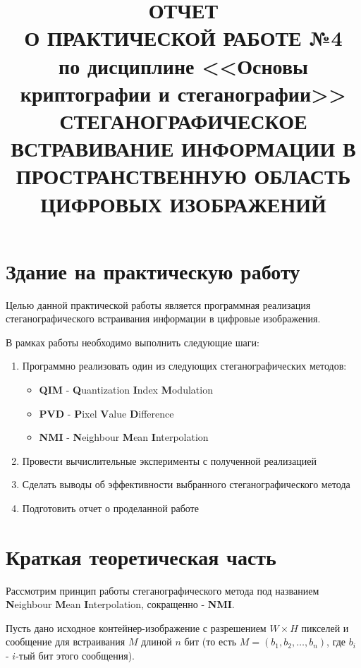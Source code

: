 \documentclass[a4paper]{article}
\title{
  ОТЧЕТ \\
  О ПРАКТИЧЕСКОЙ РАБОТЕ №4 \\
  по дисциплине <<Основы криптографии и стеганографии>> \\
  СТЕГАНОГРАФИЧЕСКОЕ ВСТРАВИВАНИЕ ИНФОРМАЦИИ В ПРОСТРАНСТВЕННУЮ ОБЛАСТЬ ЦИФРОВЫХ ИЗОБРАЖЕНИЙ
}
\begin{document}
  \templatedtitlepage
  
  \toc

  \section{Здание на практическую работу}

  Целью данной практической работы является программная реализация стеганографического встраивания информации в цифровые изображения.

  В рамках работы необходимо выполнить следующие шаги:

  \begin{enumerate}
    \setlength{\itemindent}{1cm}
    \item {
        Программно реализовать один из следующих стеганографических методов:

        \begin{itemize}
            \setlength{\itemindent}{1cm}
            \item \textbf{QIM} - \textbf{Q}uantization \textbf{I}ndex \textbf{M}odulation
            \item \textbf{PVD} - \textbf{P}ixel \textbf{V}alue \textbf{D}ifference
            \item \textbf{NMI} - \textbf{N}eighbour \textbf{M}ean \textbf{I}nterpolation
        \end{itemize}
    }
    \item {
        Провести вычислительные эксперименты с полученной реализацией
    }
    \item {
        Сделать выводы об эффективности выбранного стеганографического метода
    }
    \item {
        Подготовить отчет о проделанной работе
    }
  \end{enumerate}

  \newpage
  \section{Краткая теоретическая часть}

  Рассмотрим принцип работы стеганографического метода под названием \textbf{N}eighbour \textbf{M}ean \textbf{I}nterpolation,
  сокращенно - \textbf{NMI}.

  Пусть дано исходное контейнер-изображение с разрешением $W\times{H}$ пикселей и сообщение
  для встраивания $M$ длиной $n$ бит (то есть $M = \left(b_1, b_2, \dots, b_n\right)$,
  где $b_i$ - $i$-тый бит этого сообщения).
\end{document}
